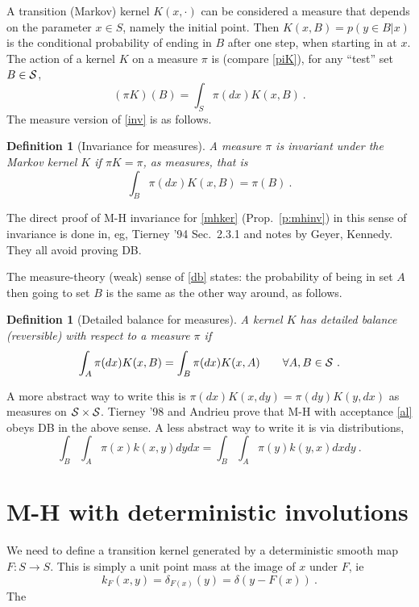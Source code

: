\documentclass[10pt]{article}
\newcommand{\be}{\begin{equation}}
\newcommand{\ee}{\end{equation}}
\newtheorem{dfn}[thm]{Definition}
\begin{document}
A transition (Markov) kernel $K(x,\cdot)$ can be considered a measure
that depends on the parameter $x\in S$, namely the initial point.
Then $K(x,B) = p(y\in B | x)$ is the conditional probability of ending in
$B$ after one step, when starting in at $x$.
The action of a kernel $K$ on a measure $\pi$ is
(compare \eqref{piK}),
for any ``test'' set $B \in \cal S$,
$$
(\pi K)(B) = \int_S \pi(dx) K(x,B)~.
$$
The measure version of \eqref{inv} is as follows.
\begin{dfn}[Invariance for measures]
  A measure $\pi$ is invariant under the Markov kernel $K$ if
  $\pi K = \pi$, as measures, that is
  \be
  \int_B \pi(dx) K(x,B) = \pi(B) ~.
  \ee
  \label{d:invm}
\end{dfn}
The direct proof of M-H invariance for \eqref{mhker} (Prop.~\ref{p:mhinv})
in this sense of invariance is
done in, eg, Tierney '94 Sec.~2.3.1 and notes by Geyer, Kennedy.
They all avoid proving DB.

The measure-theory (weak) sense of \eqref{db}
states: the probability of being in set $A$ then going to
set $B$ is the same as the other way around, as follows.
\begin{dfn}[Detailed balance for measures]
  A kernel $K$ has detailed balance (reversible) with respect to
  a measure $\pi$ if
  \be
  \int_A \pi(dx) K(x,B) = \int_B \pi(dx) K(x,A) \qquad \forall A,B \in \cal S~.
  \ee
  \label{d:dbm}
\end{dfn}
A more abstract way to write this is $\pi(dx) K(x,dy) = \pi(dy) K(y,dx)$ as measures
on $\cal S \times \cal S$.
Tierney '98 and Andrieu prove that M-H with acceptance \eqref{al}
obeys DB in the above sense.
A less abstract way to write it is via distributions,
$$
\int_B \int_A \pi(x) k(x,y) dy dx =
\int_B \int_A \pi(y) k(y,x) dx dy~.
$$




\section{M-H with deterministic involutions}

We need to define a transition kernel generated by a deterministic smooth map
$F: S\to S$.
This is simply a unit point mass at the image of $x$ under $F$, ie
$$
k_F(x,y) = \delta_{F(x)}(y) = \delta(y - F(x))~.
$$
The 
\end{document}
